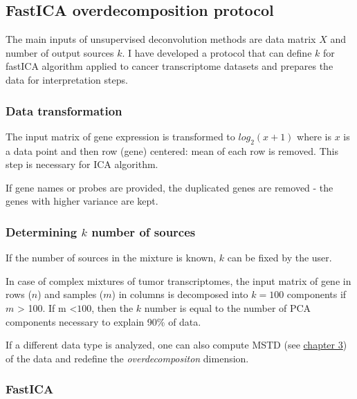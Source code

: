 \documentclass[12pt,]{book}
\theoremstyle{definition}
\theoremstyle{definition}
\theoremstyle{definition}
\theoremstyle{remark}
\begin{document}
\hypertarget{fastica-overdecomposition-protocol}{%
\subsection{FastICA overdecomposition
protocol}\label{fastica-overdecomposition-protocol}}

The main inputs of unsupervised deconvolution methods are data matrix
\(X\) and number of output sources \(k\). I have developed a protocol
that can define \(k\) for fastICA algorithm applied to cancer
transcriptome datasets and prepares the data for interpretation steps.

\hypertarget{data-transformation}{%
\subsubsection{Data transformation}\label{data-transformation}}

The input matrix of gene expression is transformed to \(log_{2}(x +1)\)
where is \(x\) is a data point and then row (gene) centered: mean of
each row is removed. This step is necessary for ICA algorithm.

If gene names or probes are provided, the duplicated genes are removed -
the genes with higher variance are kept.

\hypertarget{determining-k-number-of-sources}{%
\subsubsection{\texorpdfstring{Determining \(k\) number of
sources}{Determining k number of sources}}\label{determining-k-number-of-sources}}

If the number of sources in the mixture is known, \(k\) can be fixed by
the user.

In case of complex mixtures of tumor transcriptomes, the input matrix of
gene in rows (\(n\)) and samples (\(m\)) in columns is decomposed into
\(k=100\) components if \(m\) \textgreater{} 100. If m
\textless{}\(100\), then the \(k\) number is equal to the number of PCA
components necessary to explain 90\% of data.

If a different data type is analyzed, one can also compute MSTD (see
\protect\hyperlink{mstd}{chapter 3}) of the data and redefine the
\emph{overdecompositon} dimension.

\hypertarget{fastica}{%
\subsubsection{FastICA}\label{fastica}}
\end{document}
